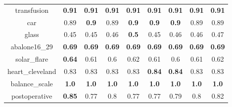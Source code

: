\documentclass{article}%
\begin{document}
\begin{tabular}{c|cccccccc}
transfusion&\textbf{0.91}&\textbf{0.91}&\textbf{0.91}&\textbf{0.91}&\textbf{0.91}&\textbf{0.91}&\textbf{0.91}&\textbf{0.91}\\%

car&0.89&\textbf{0.9}&0.89&\textbf{0.9}&\textbf{0.9}&\textbf{0.9}&0.89&0.89\\%

glass&0.45&0.45&0.46&\textbf{0.5}&0.45&0.46&0.46&0.47\\%

abalone16\_29&\textbf{0.69}&\textbf{0.69}&\textbf{0.69}&\textbf{0.69}&\textbf{0.69}&\textbf{0.69}&\textbf{0.69}&\textbf{0.69}\\%

solar\_flare&\textbf{0.64}&0.61&0.6&0.62&0.61&0.6&0.61&0.62\\%

heart\_cleveland&0.83&0.83&0.83&0.83&\textbf{0.84}&\textbf{0.84}&0.83&0.83\\%

balance\_scale&\textbf{1.0}&\textbf{1.0}&\textbf{1.0}&\textbf{1.0}&\textbf{1.0}&\textbf{1.0}&\textbf{1.0}&\textbf{1.0}\\%

postoperative&\textbf{0.85}&0.77&0.8&0.77&0.77&0.79&0.8&0.82\\%

\end{tabular}

%
\end{document}
